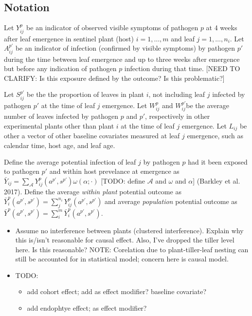 \documentclass[]{article}
\providecommand{\tightlist}{%
  \setlength{\itemsep}{0pt}\setlength{\parskip}{0pt}}
\begin{document}
\hypertarget{notation}{%
\subsection{Notation}\label{notation}}

Let \(Y^p_{ij}\) be an indicator of observed visible symptoms of
pathogen \(p\) at 4 weeks after leaf emergence in sentinel plant (host)
\(i = 1, \dots, m\) and leaf \(j = 1, \dots, n_i\). Let \(A^{p'}_{ij}\)
be an indicator of infection (confirmed by visible symptoms) by pathogen
\(p'\) during the time between leaf emergence and up to three weeks
after emergence but before any indication of pathogen \(p\) infection
during that time. {[}NEED TO CLARIFY: Is this exposure defined by the
outcome? Is this problematic?{]}

Let \(S^{p'}_{ij}\) be the the proportion of leaves in plant \(i\), not
including leaf \(j\) infected by pathogen \(p'\) at the time of leaf
\(j\) emergence. Let \(W^{p}_{ij}\) and \(W^{p'}_{ij}\)be the average
number of leaves infected by pathogen \(p\) and \(p'\), respectively in
other experimental plants other than plant \(i\) at the time of leaf
\(j\) emergence. Let \(L_{ij}\) be other a vector of other baseline
covariates measured at leaf \(j\) emergence, such as calendar time, host
age, and leaf age.

Define the average potential infection of leaf \(j\) by pathogen \(p\)
had it been exposed to pathogen \(p'\) and within host prevelance at
emergence as
\(\bar{Y}_{ij} = \sum_{\mathcal{A}} Y^p_{ij}(a^{p'}, s^{p'}) \omega(\alpha; \cdot)\)
{[}TODO: define \(\mathcal{A}\) and \(\omega\) and \(\alpha\){]}
(Barkley et al. 2017). Define the average \emph{within plant} potential
outcome as
\(\bar{Y}^p_i(a^{p'}, s^{p'}) = \sum_{j}^{n_i} Y^p_{ij}(a^{p'}, s^{p'})\)
and average \emph{population} potential outcome as
\(\bar{Y}^p(a^{p'}, s^{p'}) = \sum_{i}^{m} \bar{Y}^p_{i}(a^{p'}, s^{p'})\).

\begin{itemize}
\tightlist
\item
  Assume no interference between plants (clustered interference).
  Explain why this is/isn't reasonable for causal effect. Also, I've
  dropped the tiller level here. Is this reasonable? NOTE: Corelation
  due to plant-tiller-leaf nesting can still be accounted for in
  statistical model; concern here is causal model.
\item
  TODO:

  \begin{itemize}
  \tightlist
  \item
    add cohort effect; add as effect modifier? baseline covariate?
  \item
    add endophtye effect; as effect modifier?
  \end{itemize}
\end{itemize}
\end{document}

